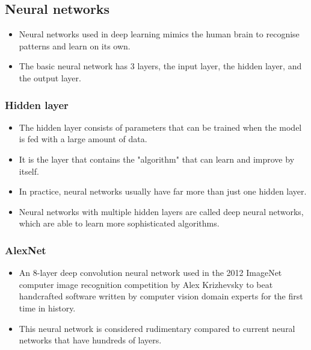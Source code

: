 \documentclass[11pt]{article}
\begin{document}
\subsection{Neural networks}
\label{sec:orgbc33e60}
\begin{itemize}
\item Neural networks used in deep learning mimics the human brain to recognise patterns and learn on its own.
\item The basic neural network has 3 layers, the input layer, the hidden layer, and the output layer.
\end{itemize}

\subsubsection{Hidden layer}
\label{sec:orgcb67367}
\begin{itemize}
\item The hidden layer consists of parameters that can be trained when the model is fed with a large amount of data.
\item It is the layer that contains the "algorithm" that can learn and improve by itself.
\item In practice, neural networks usually have far more than just one hidden layer.
\item Neural networks with multiple hidden layers are called deep neural networks, which are able to learn more sophisticated algorithms.
\end{itemize}

\subsubsection{AlexNet}
\label{sec:orged45594}
\begin{itemize}
\item An 8-layer deep convolution neural network used in the 2012 ImageNet computer image recognition competition by Alex Krizhevsky to beat handcrafted software written by computer vision domain experts for the first time in history.
\item This neural network is considered rudimentary compared to current neural networks that have hundreds of layers.
\end{itemize}
\end{document}
